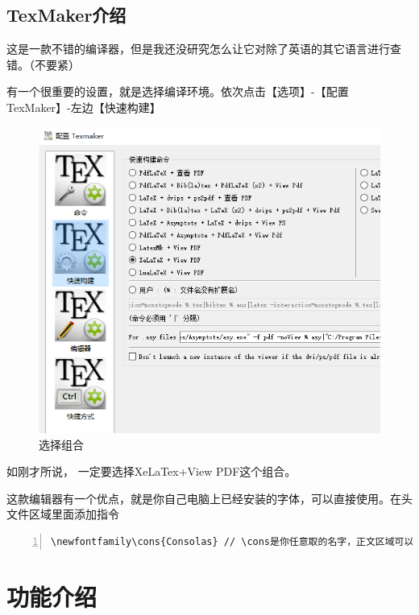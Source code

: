 \documentclass[12pt,a4paper,oneside]{book}
\begin{document}
\section{TexMaker介绍}
这是一款不错的编译器，但是我还没研究怎么让它对除了英语的其它语言进行查错。（不要紧）
\par
有一个很重要的设置，就是选择编译环境。依次点击【选项】-【配置TexMaker】-左边【快速构建】
\par
\begin{figure}[htp] 
\centering 
\includegraphics[scale=0.45]{Figures/tm.png}
\caption{选择组合}%
\label{pic:tm}
\end{figure}

\par
如刚才所说，{\color{cyan} 一定要选择}XeLaTex+View PDF这个组合。
\par
这款编辑器有一个优点，就是你自己电脑上已经安装的字体，可以直接使用。在头文件区域里面添加指令
\par
\begin{lstlisting}[language={[ANSI]C}, numbers=left, numberstyle=\tiny, keywordstyle=\color{blue!70},  frame=shadowbox, rulesepcolor=\color{red!20!green!20!blue!20}]
\newfontfamily\cons{Consolas} // \cons是你任意取的名字，正文区域可以当作指令使用
\end{lstlisting}
\par

\chapter{功能介绍}
\end{document}
